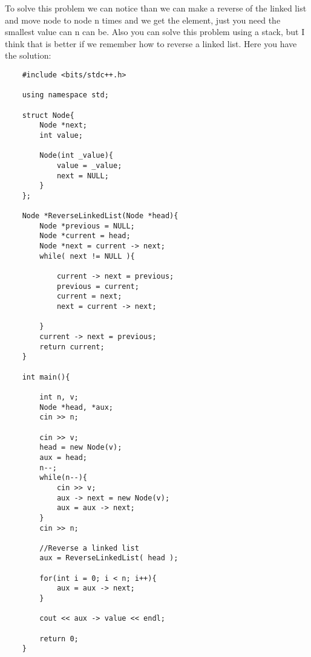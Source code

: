 To solve this problem we can notice than we can make a reverse of the linked list and move node to node n times and we get the element, just you need the smallest value can n can be.  Also you can solve this problem using a stack, but I think that is better if we remember how to reverse a linked list. Here you have the solution:
\begin{lstlisting}
    #include <bits/stdc++.h>

    using namespace std;

    struct Node{
        Node *next;
        int value;

        Node(int _value){
            value = _value;
            next = NULL;
        }
    };

    Node *ReverseLinkedList(Node *head){
        Node *previous = NULL;
        Node *current = head;
        Node *next = current -> next;
        while( next != NULL ){

            current -> next = previous;
            previous = current;
            current = next;
            next = current -> next;

        }
        current -> next = previous;
        return current;
    }

    int main(){

        int n, v;
        Node *head, *aux;
        cin >> n;   

        cin >> v;
        head = new Node(v);
        aux = head;
        n--;
        while(n--){
            cin >> v;
            aux -> next = new Node(v);
            aux = aux -> next;
        } 
        cin >> n;

        //Reverse a linked list
        aux = ReverseLinkedList( head );

        for(int i = 0; i < n; i++){
            aux = aux -> next;
        }

        cout << aux -> value << endl;

        return 0;
    }
\end{lstlisting}